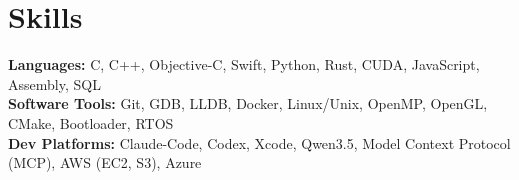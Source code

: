 \documentclass[letterpaper,11pt]{article}
\begin{document}
\vspace{-1.3em}


\section{Skills}
 \begin{itemize}[leftmargin=0.15in, label={}]
    \small{\item{
    \textbf{Languages:}{ C, C++, Objective-C, Swift, Python, Rust, CUDA, JavaScript, Assembly, SQL} \\
    \textbf{Software Tools:}{ Git, GDB, LLDB, Docker, Linux/Unix, OpenMP, OpenGL, CMake, Bootloader, RTOS} \\
    \textbf{Dev Platforms:}{ Claude-Code, Codex, Xcode, Qwen3.5, Model Context Protocol (MCP), AWS (EC2, S3), Azure} \\
    }}
 \end{itemize}


\end{document}
